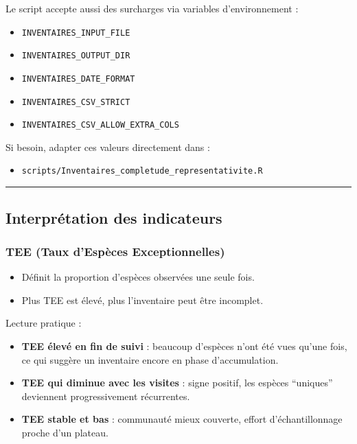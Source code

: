Le script accepte aussi des surcharges via variables d'environnement :

\begin{itemize}
\tightlist
\item
  \texttt{INVENTAIRES\_INPUT\_FILE}
\item
  \texttt{INVENTAIRES\_OUTPUT\_DIR}
\item
  \texttt{INVENTAIRES\_DATE\_FORMAT}
\item
  \texttt{INVENTAIRES\_CSV\_STRICT}
\item
  \texttt{INVENTAIRES\_CSV\_ALLOW\_EXTRA\_COLS}
\end{itemize}

Si besoin, adapter ces valeurs directement dans :

\begin{itemize}
\tightlist
\item
  \texttt{scripts/Inventaires\_completude\_representativite.R}
\end{itemize}

\begin{center}\rule{0.5\linewidth}{0.5pt}\end{center}

\subsection{Interprétation des
indicateurs}\label{interpruxe9tation-des-indicateurs}

\subsubsection{TEE (Taux d'Espèces
Exceptionnelles)}\label{tee-taux-despuxe8ces-exceptionnelles}

\begin{itemize}
\tightlist
\item
  Définit la proportion d'espèces observées une seule fois.
\item
  Plus TEE est élevé, plus l'inventaire peut être incomplet.
\end{itemize}

Lecture pratique :

\begin{itemize}
\tightlist
\item
  \textbf{TEE élevé en fin de suivi} : beaucoup d'espèces n'ont été vues
  qu'une fois, ce qui suggère un inventaire encore en phase
  d'accumulation.
\item
  \textbf{TEE qui diminue avec les visites} : signe positif, les espèces
  ``uniques'' deviennent progressivement récurrentes.
\item
  \textbf{TEE stable et bas} : communauté mieux couverte, effort
  d'échantillonnage proche d'un plateau.
\end{itemize}

